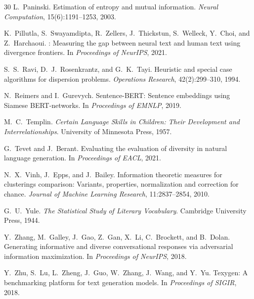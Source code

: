 \documentclass[11pt,a4paper]{article}
\begin{document}
\begin{thebibliography}{30}
L.~Paninski.
\newblock Estimation of entropy and mutual information.
\newblock \emph{Neural Computation}, 15(6):1191--1253, 2003.

K.~Pillutla, S.~Swayamdipta, R.~Zellers, J.~Thickstun,
  S.~Welleck, Y.~Choi, and Z.~Harchaoui.
: Measuring the gap between neural text and
  human text using divergence frontiers.
\newblock In \emph{Proceedings of NeurIPS}, 2021.

S.~S.~Ravi, D.~J.~Rosenkrantz, and G.~K.~Tayi.
\newblock Heuristic and special case algorithms for dispersion
  problems.
\newblock \emph{Operations Research}, 42(2):299--310, 1994.

N.~Reimers and I.~Gurevych.
\newblock Sentence-{BERT}: Sentence embeddings using {S}iamese
  {BERT}-networks.
\newblock In \emph{Proceedings of EMNLP}, 2019.

M.~C.~Templin.
\newblock \emph{Certain Language Skills in Children: Their
  Development and Interrelationships}.
\newblock University of Minnesota Press, 1957.

G.~Tevet and J.~Berant.
\newblock Evaluating the evaluation of diversity in natural
  language generation.
\newblock In \emph{Proceedings of EACL}, 2021.

N.~X.~Vinh, J.~Epps, and J.~Bailey.
\newblock Information theoretic measures for clusterings comparison:
  Variants, properties, normalization and correction for chance.
\newblock \emph{Journal of Machine Learning Research},
  11:2837--2854, 2010.

G.~U.~Yule.
\newblock \emph{The Statistical Study of Literary Vocabulary}.
\newblock Cambridge University Press, 1944.

Y.~Zhang, M.~Galley, J.~Gao, Z.~Gan, X.~Li, C.~Brockett, and
  B.~Dolan.
\newblock Generating informative and diverse conversational
  responses via adversarial information maximization.
\newblock In \emph{Proceedings of NeurIPS}, 2018.

Y.~Zhu, S.~Lu, L.~Zheng, J.~Guo, W.~Zhang, J.~Wang, and Y.~Yu.
\newblock Texygen: A benchmarking platform for text generation
  models.
\newblock In \emph{Proceedings of SIGIR}, 2018.


\end{thebibliography}
\end{document}
